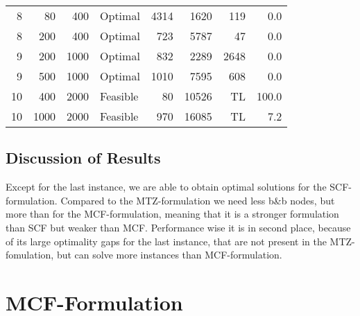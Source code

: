 \documentclass[11pt]{article}
\begin{document}
\begin{tabular}{rrrlrrrr}
        8 &    80 &          400 &         Optimal &       4314 &      1620 &           119 &                 0.0 \\
        8 &   200 &          400 &         Optimal &        723 &      5787 &            47 &                 0.0 \\
        9 &   200 &         1000 &         Optimal &        832 &      2289 &          2648 &                 0.0 \\
        9 &   500 &         1000 &         Optimal &       1010 &      7595 &           608 &                 0.0 \\
       10 &   400 &         2000 &        Feasible &         80 &     10526 &            TL &               100.0 \\
       10 &  1000 &         2000 &        Feasible &        970 &     16085 &            TL &                 7.2 \\
\bottomrule
\end{tabular}
\subsection{Discussion of Results}
Except for the last instance, we are able to obtain optimal solutions for the SCF-formulation. Compared to the MTZ-formulation we need less b\&b nodes, but more than for the MCF-formulation, meaning that it is a stronger formulation than SCF but weaker than MCF. Performance wise it is in second place, because of its large optimality gaps for the last instance, that are not present in the MTZ-fomulation, but can solve more instances than MCF-formulation.

\section{MCF-Formulation}
\end{document}
